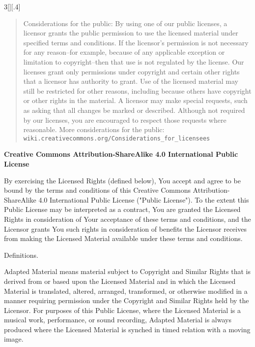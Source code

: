\documentclass[8pt,a4paper]{article}
\begin{document}
\begin{multicols}{3}[][.4\paperwidth]
{\begin{quote}
     Considerations for the public: By using one of our public
     licenses, a licensor grants the public permission to use the
     licensed material under specified terms and conditions. If
     the licensor's permission is not necessary for any reason--for
     example, because of any applicable exception or limitation to
     copyright--then that use is not regulated by the license. Our
     licenses grant only permissions under copyright and certain
     other rights that a licensor has authority to grant. Use of
     the licensed material may still be restricted for other
     reasons, including because others have copyright or other
     rights in the material. A licensor may make special requests,
     such as asking that all changes be marked or described.
     Although not required by our licenses, you are encouraged to
     respect those requests where reasonable.
     More considerations for the public: 
     \texttt{wiki.creativecommons.org/Considerations\_for\_licensees}

   \end{quote}

}

\medskip

\textbf{Creative Commons Attribution-ShareAlike 4.0
International Public License}

By exercising the Licensed Rights (defined below), You accept and agree
to be bound by the terms and conditions of this Creative Commons
Attribution-ShareAlike 4.0 International Public License ("Public
License"). To the extent this Public License may be interpreted as a
contract, You are granted the Licensed Rights in consideration of Your
acceptance of these terms and conditions, and the Licensor grants You
such rights in consideration of benefits the Licensor receives from
making the Licensed Material available under these terms and
conditions.

\begin{longenum}

  \item Definitions.

  \begin{longenum}

  \item Adapted Material means material subject to Copyright and Similar
     Rights that is derived from or based upon the Licensed Material
     and in which the Licensed Material is translated, altered,
     arranged, transformed, or otherwise modified in a manner requiring
     permission under the Copyright and Similar Rights held by the
     Licensor. For purposes of this Public License, where the Licensed
     Material is a musical work, performance, or sound recording,
     Adapted Material is always produced where the Licensed Material is
     synched in timed relation with a moving image.


\end{longenum}
\end{longenum}
\end{multicols}
\end{document}
